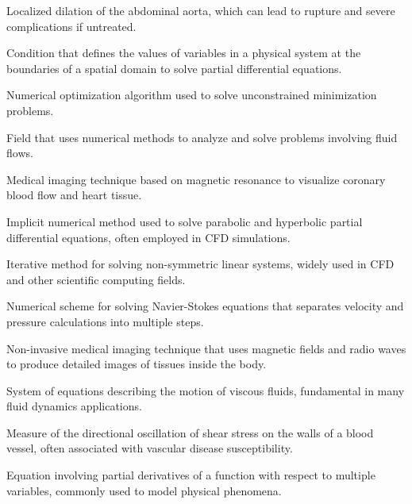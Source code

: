 %
%


 Localized dilation of the abdominal aorta, which can lead to rupture and severe complications if untreated.

 Condition that defines the values of variables in a physical system at the boundaries of a spatial domain to solve partial differential equations.

 Numerical optimization algorithm used to solve unconstrained minimization problems.

 Field that uses numerical methods to analyze and solve problems involving fluid flows.

 Medical imaging technique based on magnetic resonance to visualize coronary blood flow and heart tissue.

 Implicit numerical method used to solve parabolic and hyperbolic partial differential equations, often employed in CFD simulations.

 Iterative method for solving non-symmetric linear systems, widely used in CFD and other scientific computing fields.

 Numerical scheme for solving Navier-Stokes equations that separates velocity and pressure calculations into multiple steps.

 Non-invasive medical imaging technique that uses magnetic fields and radio waves to produce detailed images of tissues inside the body.

 System of equations describing the motion of viscous fluids, fundamental in many fluid dynamics applications.

 Measure of the directional oscillation of shear stress on the walls of a blood vessel, often associated with vascular disease susceptibility.

 Equation involving partial derivatives of a function with respect to multiple variables, commonly used to model physical phenomena.

